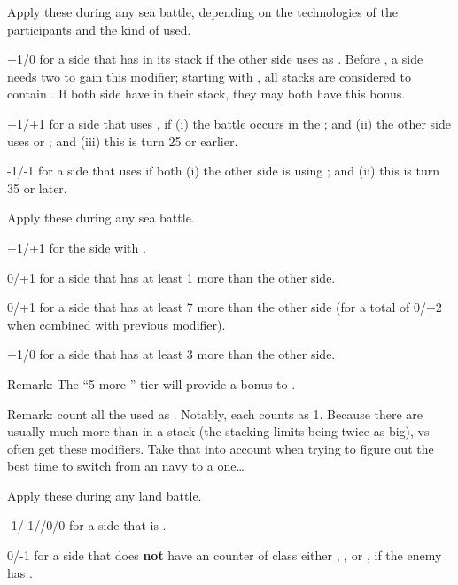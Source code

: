  Apply these during any sea battle,
depending on the technologies of the participants and the kind of  used.
\begin{modlist}
\item[+1/0] for a side that has \VGD in its stack if the other side uses \NGD
  as . Before \TBAT, a side needs two \VGD to gain
  this modifier; starting with \TBAT, all \NGD stacks are considered to
  contain \VGD. If both side have \VGD in their stack, they may both have
  this bonus.
\item[+1/+1] for a side that uses \NGD, if (i) the battle occurs in the
  ; and (ii) the other side uses \NWD or \NTD; and (iii)
  this is turn 25 or earlier.
\item[-1/-1] for a side that uses \NGD if both (i) the other side is using
  \NWD; and (ii) this is turn 35 or later.
\end{modlist}

 Apply these during any sea battle.
\begin{modlist}
\item[+1/+1] for the side with .
\item[0/+1] for a side that has at least 1 more \ND than the other side.
\item[0/+1] for a side that has at least 7 more \ND than the other side
  (for a total of 0/+2 when combined with previous modifier).
\item[+1/0] for a side that has at least 3 more \ND than the other side.
\end{modlist}

Remark: The ``5 more \ND'' tier will provide a bonus to .

Remark: count all the \ND used as . Notably, each \NGD
counts as 1\ND. Because there are usually much more \NGD than \NWD in a stack
(the stacking limits being twice as big), \NGD vs \NWD often get these
modifiers. Take that into account when trying to figure out the best time to
switch from an \NGD navy to a \NWD one\ldots

 Apply these during any land battle.
\begin{modlist}
\item[-1/-1//0/0] for a side that is .
\item[0/-1] for a side that does \textbf{not} have an \ARMY counter of class
  either \CAI, \CAIM, \CAII or \CAIIM, if the enemy has \TTER.
\end{modlist}

